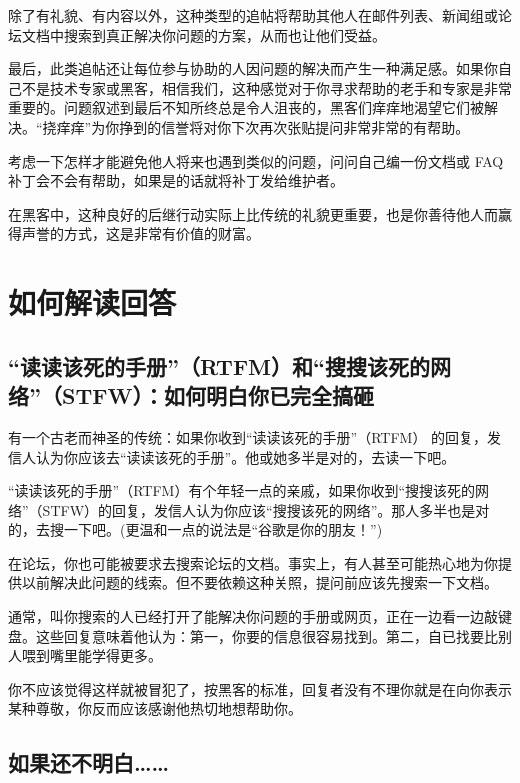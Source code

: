 除了有礼貌、有内容以外，这种类型的追帖将帮助其他人在邮件列表、新闻组或论坛文档中搜索到真正解决你问题的方案，从而也让他们受益。

最后，此类追帖还让每位参与协助的人因问题的解决而产生一种满足感。如果你自己不是技术专家或黑客，相信我们，这种感觉对于你寻求帮助的老手和专家是非常重要的。问题叙述到最后不知所终总是令人沮丧的，黑客们痒痒地渴望它们被解决。“挠痒痒”为你挣到的信誉将对你下次再次张贴提问非常非常的有帮助。

考虑一下怎样才能避免他人将来也遇到类似的问题，问问自己编一份文档或 FAQ 补丁会不会有帮助，如果是的话就将补丁发给维护者。

在黑客中，这种良好的后继行动实际上比传统的礼貌更重要，也是你善待他人而赢得声誉的方式，这是非常有价值的财富。




\section{如何解读回答}






\subsection{“读读该死的手册”（RTFM）和“搜搜该死的网络”（STFW）：如何明白你已完全搞砸}


有一个古老而神圣的传统：如果你收到“读读该死的手册”（RTFM） 的回复，发信人认为你应该去“读读该死的手册”。他或她多半是对的，去读一下吧。

“读读该死的手册”（RTFM）有个年轻一点的亲戚，如果你收到“搜搜该死的网络”（STFW）的回复，发信人认为你应该“搜搜该死的网络”。那人多半也是对的，去搜一下吧。(更温和一点的说法是“谷歌是你的朋友！”)

在论坛，你也可能被要求去搜索论坛的文档。事实上，有人甚至可能热心地为你提供以前解决此问题的线索。但不要依赖这种关照，提问前应该先搜索一下文档。

通常，叫你搜索的人已经打开了能解决你问题的手册或网页，正在一边看一边敲键盘。这些回复意味着他认为：第一，你要的信息很容易找到。第二，自已找要比别人喂到嘴里能学得更多。

你不应该觉得这样就被冒犯了，按黑客的标准，回复者没有不理你就是在向你表示某种尊敬，你反而应该感谢他热切地想帮助你。



\subsection{如果还不明白……}



